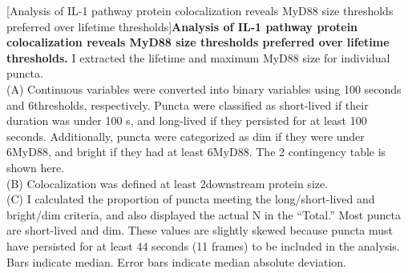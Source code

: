 \begin{centering}
\captionsetup{parbox=none}
[Analysis of IL-1 pathway protein colocalization reveals MyD88 size thresholds preferred over lifetime thresholds]{\textbf{Analysis of IL-1 pathway protein colocalization reveals MyD88 size thresholds preferred over lifetime thresholds.} I extracted the lifetime and maximum MyD88 size for individual puncta.
\vspace{1em}
\\
(A) Continuous variables were converted into binary variables using 100 seconds and 6\times thresholds, respectively. Puncta were classified as short-lived if their duration was under 100 s, and long-lived if they persisted for at least 100 seconds. Additionally, puncta were categorized as dim if they were under 6\times MyD88, and bright if they had at least 6\times MyD88. The 2 contingency table is shown here.
\vspace{1em}
\\
(B) Colocalization was defined at least 2\times downstream protein size.
\vspace{1em}
\\
(C) I calculated the proportion of puncta meeting the long/short-lived and bright/dim criteria, and also displayed the actual N in the “Total.” Most puncta are short-lived and dim. These values are slightly skewed because puncta must have persisted for at least 44 seconds (11 frames) to be included in the analysis. Bars indicate median. Error bars indicate median absolute deviation.
}
\end{centering}
